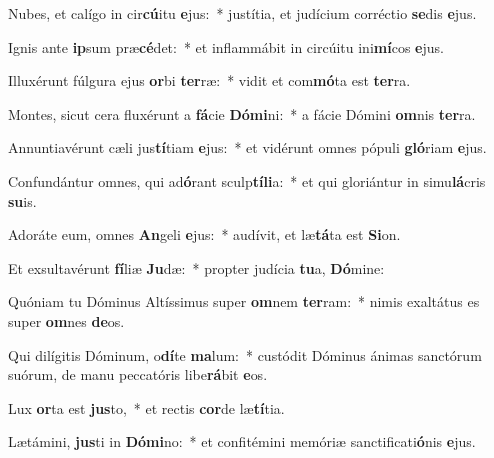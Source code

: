 \item Nubes, et calígo in cir\textbf{cú}itu \textbf{e}jus:~* justítia, et judícium corréctio \textbf{se}dis \textbf{e}jus.
\item Ignis ante \textbf{ip}sum præ\textbf{cé}det:~* et inflammábit in circúitu ini\textbf{mí}cos \textbf{e}jus.
\item Illuxérunt fúlgura ejus \textbf{or}bi \textbf{ter}ræ:~* vidit et com\textbf{mó}ta est \textbf{ter}ra.
\item Montes, sicut cera fluxérunt a \textbf{fá}cie \textbf{Dó}\textbf{mi}ni:~* a fácie Dómini \textbf{om}nis \textbf{ter}ra.
\item Annuntiavérunt cæli jus\textbf{tí}tiam \textbf{e}jus:~* et vidérunt omnes pópuli \textbf{gló}riam \textbf{e}jus.
\item Confundántur omnes, qui ad\textbf{ó}rant sculp\textbf{tí}\textbf{li}a:~* et qui gloriántur in simu\textbf{lá}cris \textbf{su}is.
\item Adoráte eum, omnes \textbf{An}geli \textbf{e}jus:~* audívit, et læ\textbf{tá}ta est \textbf{Si}on.
\item Et exsultavérunt \textbf{fí}liæ \textbf{Ju}dæ:~* propter judícia \textbf{tu}a, \textbf{Dó}mine:
\item Quóniam tu Dóminus Altíssimus super \textbf{om}nem \textbf{ter}ram:~* nimis exaltátus es super \textbf{om}nes \textbf{de}os.
\item Qui dilígitis Dóminum, o\textbf{dí}te \textbf{ma}lum:~* custódit Dóminus ánimas sanctórum suórum, de manu peccatóris libe\textbf{rá}bit \textbf{e}os.
\item Lux \textbf{or}ta est \textbf{jus}to,~* et rectis \textbf{cor}de læ\textbf{tí}tia.
\item Lætámini, \textbf{jus}ti in \textbf{Dó}\textbf{mi}no:~* et confitémini memóriæ sanctificati\textbf{ó}nis \textbf{e}jus.
